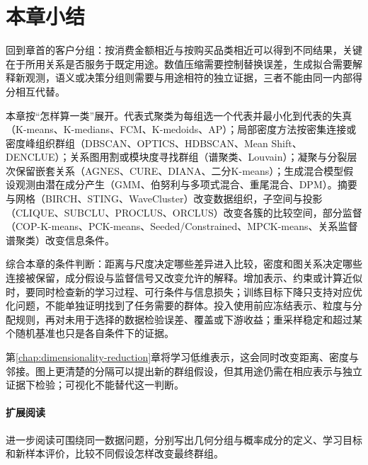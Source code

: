 \section{本章小结}
\label{sec:clustering-summary}

回到章首的客户分组：按消费金额相近与按购买品类相近可以得到不同结果，关键在于所用关系是否服务于既定用途。数值压缩需要控制替换误差，生成拟合需要解释新观测，语义或决策分组则需要与用途相符的独立证据，三者不能由同一内部得分相互代替。

本章按“怎样算一类”展开。代表式聚类为每组选一个代表并最小化到代表的失真（K-means、K-medians、FCM、K-medoids、AP）；局部密度方法按密集连接或密度峰组织群组（DBSCAN、OPTICS、HDBSCAN、Mean Shift、DENCLUE）；关系图用割或模块度寻找群组（谱聚类、Louvain）；凝聚与分裂层次保留嵌套关系（AGNES、CURE、DIANA、二分K-means）；生成混合模型假设观测由潜在成分产生（GMM、伯努利与多项式混合、重尾混合、DPM）。摘要与网格（BIRCH、STING、WaveCluster）改变数据组织，子空间与投影（CLIQUE、SUBCLU、PROCLUS、ORCLUS）改变各簇的比较空间，部分监督（COP-K-means、PCK-means、Seeded/Constrained、MPCK-means、关系监督谱聚类）改变信息条件。

综合本章的条件判断：距离与尺度决定哪些差异进入比较，密度和图关系决定哪些连接被保留，成分假设与监督信号又改变允许的解释。增加表示、约束或计算近似时，要同时检查新的学习过程、可行条件与信息损失；训练目标下降只支持对应优化问题，不能单独证明找到了任务需要的群体。投入使用前应冻结表示、粒度与分配规则，再对未用于选择的数据检验误差、覆盖或下游收益；重采样稳定和超过某个随机基准也只是各自条件下的证据。

第\ref{chap:dimensionality-reduction}章将学习低维表示，这会同时改变距离、密度与邻接。图上更清楚的分隔可以提出新的群组假设，但其用途仍需在相应表示与独立证据下检验；可视化不能替代这一判断。

\paragraph{扩展阅读}
进一步阅读可围绕同一数据问题，分别写出几何分组与概率成分的定义、学习目标和新样本评价，比较不同假设怎样改变最终群组。
\endgroup
